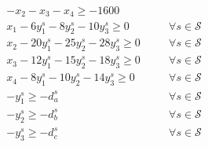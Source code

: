 \documentclass[7pt]{article}
\begin{document}
\begin{align*}
     & -x_2 - x_3 - x_4 \geq -1600                                                                                                                                                                                                                                                                                                 \\
     & x_1 - 6 y_1^s - 8 y_2^s - 10 y_3^s \geq 0 \quad                                                                                                                                                                                                                                              &  & \forall s \in \mathcal{S} \\
     & x_2 - 20 y_1^s - 25 y_2^s - 28 y_3^s \geq 0 \quad                                                                                                                                                                                                                                            &  & \forall s \in \mathcal{S} \\
     & x_3 - 12 y_1^s - 15 y_2^s - 18 y_3^s \geq 0 \quad                                                                                                                                                                                                                                            &  & \forall s \in \mathcal{S} \\
     & x_4 - 8 y_1^s - 10 y_2^s - 14 y_3^s \geq 0 \quad                                                                                                                                                                                                                                             &  & \forall s \in \mathcal{S} \\
     & -y_1^s \geq -d_a^s                                                                                                                                                                                                                                                                           &  & \forall s \in \mathcal{S} \\
     & -y_2^s \geq -d_b^s                                                                                                                                                                                                                                                                           &  & \forall s \in \mathcal{S} \\
     & -y_3^s \geq -d_c^s                                                                                                                                                                                                                                                                           &  & \forall s \in \mathcal{S} \\

\end{align*}
\end{document}
